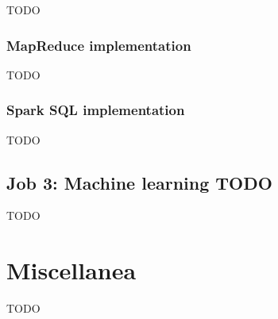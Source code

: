   TODO

  \subsubsection{MapReduce implementation}\label{subsub:job2:mapreduce}

  TODO

  \subsubsection{Spark SQL implementation}\label{subsub:job2:spark}

  TODO

  \subsection[%
    Job 3: Machine learning%
  ]{%
    Job 3: Machine learning TODO%
  }\label{subsec:job3}

  TODO

  \section{Miscellanea}\label{sec:miscellaneous}

  TODO



